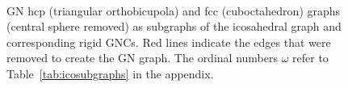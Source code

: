 \begin{figure}[htb]
    \centering
    \\
    \caption{GN hcp (triangular orthobicupola) and fcc (cuboctahedron) graphs
    (central sphere removed) as subgraphs of the icosahedral graph and
    corresponding rigid GNCs.  Red lines indicate the edges that were removed to
    create the GN graph. The ordinal numbers $\omega$ refer to
    Table~\ref{tab:icosubgraphs} in the appendix.}
    \label{fig:GNshellgraphs}
\end{figure}

